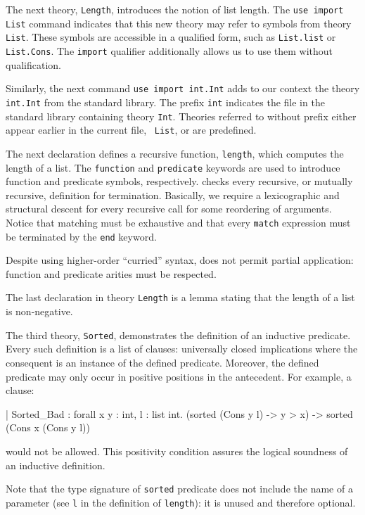 The next theory, \texttt{Length}, introduces the notion of list
length. The \texttt{use import List} command indicates that this new
theory may refer to symbols from theory \texttt{List}. These symbols
are accessible in a qualified form, such as \texttt{List.list} or
\texttt{List.Cons}. The \texttt{import} qualifier additionally allows
us to use them without qualification.

Similarly, the next command \texttt{use import int.Int} adds to our
context the theory \texttt{int.Int} from the standard library. The
prefix \texttt{int} indicates the file in the standard library
containing theory \texttt{Int}. Theories referred to without prefix
either appear earlier in the current file, \eg\ \texttt{List}, or are
predefined.

The next declaration defines a recursive function, \texttt{length},
which computes the length of a list. The \texttt{function} and
\texttt{predicate} keywords are used to introduce function and
predicate symbols, respectively.
\why checks every recursive, or mutually recursive, definition for
termination. Basically, we require a lexicographic and structural
descent for every recursive call for some reordering of arguments.
Notice that matching must be exhaustive and that every \texttt{match}
expression must be terminated by the \texttt{end} keyword.

Despite using higher-order ``curried'' syntax, \why does not permit
partial application: function and predicate arities must be respected.

The last declaration in theory \texttt{Length} is a lemma stating that
the length of a list is non-negative.

The third theory, \texttt{Sorted}, demonstrates the definition of
an inductive predicate. Every such definition is a list of clauses:
universally closed implications where the consequent is an instance
of the defined predicate. Moreover, the defined predicate may only
occur in positive positions in the antecedent. For example, a clause:
\begin{whycode}
  | Sorted_Bad :
      forall x y : int, l : list int.
      (sorted (Cons y l) -> y > x) -> sorted (Cons x (Cons y l))
\end{whycode}
would not be allowed. This positivity condition assures the logical
soundness of an inductive definition.

Note that the type signature of \lstinline{sorted} predicate does not
include the name of a parameter (see \texttt{l} in the definition
of \texttt{length}): it is unused and therefore optional.

